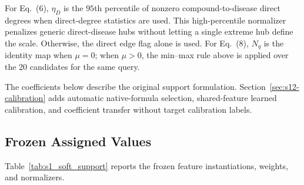\documentclass[11pt]{article}
\newcommand{\mainequation}[1]{Eq.~(#1)}
\begin{document}
    For \mainequation{6}, \(\eta_D\) is the \(95\)th percentile of nonzero compound-to-disease direct degrees when direct-degree statistics are used. This high-percentile normalizer penalizes generic direct-disease hubs without letting a single extreme hub define the scale. Otherwise, the direct edge flag alone is used. For \mainequation{8}, \(N_q\) is the identity map when \(\mu=0\); when \(\mu>0\), the min--max rule above is applied over the 20 candidates for the same query.
    \begin{revisionblock}The coefficients below describe the original support formulation. Section~\ref{sec:s12-calibration} adds automatic native-formula selection, shared-feature learned calibration, and coefficient transfer without target calibration labels.\end{revisionblock}

    \subsection{Frozen Assigned Values}

    Table~\ref{tab:s1_soft_support} reports the frozen feature instantiations, weights, and normalizers.
\end{document}
